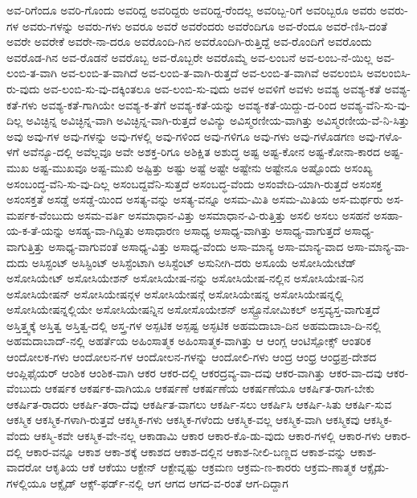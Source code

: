 {ಅವ-ರಿಗೆಂದೂ
ಅವರಿ-ಗೊಂದು
ಅವರಿದ್ದ
ಅವರಿದ್ದರು
ಅವರಿದ್ದ-ರೆಂದಲ್ಲ
ಅವರಿಬ್ಬ-ರಿಗೆ
ಅವರಿಬ್ಬರೂ
ಅವರು
ಅವರು-ಗಳ
ಅವರು-ಗಳನ್ನು
ಅವರು-ಗಳು
ಅವರೂ
ಅವರೆ
ಅವರೆಂದರು
ಅವರೆಂದಿಗೂ
ಅವ-ರೆಂದೂ
ಅವರೆ-ಣಿಸಿ-ದಂತೆ
ಅವರೇ
ಅವರೇಕೆ
ಅವರೇ-ನಾ-ದರೂ
ಅವರೊಂದಿ-ಗಿನ
ಅವರೊಂದಿಗಿ-ರುತ್ತಿದ್ದೆ
ಅವ-ರೊಂದಿಗೆ
ಅವರೊಂದು
ಅವರೊಡ-ಗಿನ
ಅವ-ರೊಡನೆ
ಅವರೊಬ್ಬ
ಅವ-ರೊಬ್ಬರೇ
ಅವರೊಮ್ಮೆ
ಅವ-ಲಂಬನೆ
ಅವ-ಲಂಬ-ನೆ-ಯಿಲ್ಲ
ಅವ-ಲಂಬಿ-ತ-ವಾಗಿ
ಅವ-ಲಂಬಿ-ತ-ವಾಗಿದೆ
ಅವ-ಲಂಬಿ-ತ-ವಾಗಿ-ರುತ್ತದೆ
ಅವ-ಲಂಬಿ-ತ-ವಾಗಿವೆ
ಅವಲಂಬಿಸಿ
ಅವಲಂಬಿಸಿ-ರು-ವುದು
ಅವ-ಲಂಬಿ-ಸು-ವು-ದಕ್ಕಿಂತಲೂ
ಅವ-ಲಂಬಿ-ಸು-ವುದು
ಅವಳ
ಅವಳಿಗೆ
ಅವಳು
ಅವಶ್ಯ
ಅವಶ್ಯ-ಕತೆ
ಅವಶ್ಯ-ಕತೆ-ಗಳು
ಅವಶ್ಯ-ಕತೆ-ಗಾಗಿಯೇ
ಅವಶ್ಯ-ಕ-ತೆಗೆ
ಅವಶ್ಯ-ಕತೆ-ಯನ್ನು
ಅವಶ್ಯ-ಕತೆ-ಯಿದ್ದು-ದ-ರಿಂದ
ಅವಶ್ಯ-ವೆನಿ-ಸು-ವು-ದಿಲ್ಲ
ಅವಿಚ್ಛಿನ್ನ
ಅವಿಚ್ಛಿನ್ನ-ವಾಗಿ
ಅವಿಚ್ಛಿನ್ನ-ವಾಗಿ-ರುತ್ತದೆ
ಅವಿನ್ಯು
ಅವಿಸ್ಮರಣೀಯ-ವಾಗಿತ್ತು
ಅವಿಸ್ಮರಣೀಯ-ವೆ-ನಿ-ಸಿತ್ತು
ಅವು
ಅವು-ಗಳ
ಅವು-ಗಳನ್ನು
ಅವು-ಗಳಲ್ಲಿ
ಅವು-ಗಳಿಂದ
ಅವು-ಗಳಿಗೂ
ಅವು-ಗಳು
ಅವು-ಗಳೊಡಗಣ
ಅವು-ಗಳೊ-ಳಗೆ
ಅವೆನ್ಯೂ-ದಲ್ಲಿ
ಅವೆಲ್ಲವೂ
ಅವೇ
ಅಶಕ್ತ-ರಿಗೂ
ಅಶಿಕ್ಷಿತ
ಅಶುದ್ಧ
ಅಷ್ಟ
ಅಷ್ಟ-ಕೋನ
ಅಷ್ಟ-ಕೋನಾ-ಕಾರದ
ಅಷ್ಟ-ಮುಖ
ಅಷ್ಟ-ಮುಖವೂ
ಅಷ್ಟ-ಮುಖಿ
ಅಷ್ಟಿತ್ತು
ಅಷ್ಟು
ಅಷ್ಟೆ
ಅಷ್ಟೇ
ಅಷ್ಟೇನು
ಅಷ್ಟೇನೂ
ಅಷ್ಟೊಂದು
ಅಸಂಖ್ಯ
ಅಸಂಬಂದ್ಧ-ವೆನಿ-ಸು-ವು-ದಿಲ್ಲ
ಅಸಂಬದ್ದವೆನಿ-ಸುತ್ತದೆ
ಅಸಂಬದ್ಧ-ವೆಂದು
ಅಸಂವೇದಿ-ಯಾಗಿ-ರುತ್ತದೆ
ಅಸಂಸಕ್ತ
ಅಸಂಸಕ್ತತೆ
ಅಸಡ್ಡೆ
ಅಸಡ್ಡೆ-ಯಿಂದ
ಅಸತ್ಯ-ವನ್ನು
ಅಸತ್ಯ-ವನ್ನೂ
ಅಸಮ-ಮಿತಿ
ಅಸಮ-ಮಿತಿಯ
ಅಸ-ಮರ್ಥರು
ಅಸ-ಮರ್ಪಕ-ವೆಂಬುದು
ಅಸಮ-ವರ್ತಿ
ಅಸಮಾಧಾನ-ವಿತ್ತು
ಅಸಮಾಧಾನ-ವಿ-ರುತ್ತಿತ್ತು
ಅಸಲಿ
ಅಸಲು
ಅಸಹನೆ
ಅಸಹಾ-ಯ-ಕ-ತೆ-ಯನ್ನು
ಅಸಹ್ಯ-ವಾ-ಗಿದ್ದಿತು
ಅಸಾಧಾರಣ
ಅಸಾಧ್ಯ
ಅಸಾಧ್ಯ-ವಾಗಿತ್ತು
ಅಸಾಧ್ಯ-ವಾಗುತ್ತದೆ
ಅಸಾಧ್ಯ-ವಾಗುತ್ತಿತ್ತು
ಅಸಾಧ್ಯ-ವಾಗುವಂತೆ
ಅಸಾಧ್ಯ-ವಿತ್ತು
ಅಸಾಧ್ಯ-ವೆಂದು
ಅಸಾ-ಮಾನ್ಯ
ಅಸಾ-ಮಾನ್ಯ-ವಾದ
ಅಸಾ-ಮಾನ್ಯ-ವಾ-ದುದು
ಅಸಿಸ್ಟಂಟ್
ಅಸಿಸ್ಟಿಂಟ್
ಅಸಿಸ್ಟೆಂಟಾಗಿ
ಅಸಿಸ್ಟೆಂಟ್
ಅಸುನೀಗಿ-ದರು
ಅಸೂಯೆ
ಅಸೋಸಿಯೇಟೆಡ್
ಅಸೋಸಿಯೇಟ್
ಅಸೋಸಿಯೇಶನ್
ಅಸೋಸಿಯೇಷ-ನನ್ನು
ಅಸೋಸಿಯೇಷ-ನಲ್ಲಿನ
ಅಸೋಸಿಯೇಷ-ನಿನ
ಅಸೋಸಿಯೇಷನ್
ಅಸೋಸಿಯೇಷನ್ಗಳ
ಅಸೋಸಿಯೇಷನ್ಗೆ
ಅಸೋಸಿಯೇಷನ್ನ
ಅಸೋಸಿಯೇಷನ್ನಲ್ಲಿ
ಅಸೋಸಿಯೇಷನ್ನಲ್ಲಿಯೇ
ಅಸೋಸಿಯೇಷನ್ನಿನ
ಅಸೋಸೊಯೇಶನ್
ಅಸ್ಟ್ರೊನೋಮಿಕಲ್
ಅಸ್ತವ್ಯಸ್ತ-ವಾಗುತ್ತದೆ
ಅಸ್ತಿತ್ತ್ವಕ್ಕೆ
ಅಸ್ತಿತ್ವ
ಅಸ್ತಿತ್ವ-ದಲ್ಲಿ
ಅಸ್ತ್ರ-ಗಳ
ಅಸ್ಪಟಿಕ
ಅಸ್ಪಷ್ಟ
ಅಸ್ಫಟಿಕ
ಅಹಮದಾಬಾ-ದಿನ
ಅಹಮದಾಬಾ-ದಿ-ನಲ್ಲಿ
ಅಹಮದಾಬಾದ್-ನಲ್ಲಿ
ಅಹರ್ತೆಯ
ಅಹಿಂಸಾತ್ಮಕ
ಅಹಿಂಸಾತ್ಮಕ-ವಾಗಿತ್ತು
ಆ
ಆಂಗ್ಲ
ಆಂಟಿಸ್ಪೋಕ್ಸ್
ಆಂತರಿಕ
ಆಂದೋಲಕ-ಗಳು
ಆಂದೋಲನ-ಗಳ
ಆಂದೋಲನ-ಗಳನ್ನು
ಆಂದೋಲಿ-ಗಳು
ಆಂದ್ರ
ಆಂಧ್ರ
ಆಂಧ್ರಪ್ರ-ದೇಶದ
ಆಂಪ್ಲಿಫೈಯರ್
ಆಂಶಿಕ
ಆಂಶಿಕ-ವಾಗಿ
ಆಕರ
ಆಕರ-ದಲ್ಲಿ
ಆಕರದ್ರವ್ಯ-ವಾ-ದವು
ಆಕರ-ವಾಗಿತ್ತು
ಆಕರ-ವಾ-ದವು
ಆಕರ-ವೆಂಬುದು
ಆಕರ್ಷಕ
ಆಕರ್ಷಕ-ವಾಗಿಯೂ
ಆಕರ್ಷಣೆ
ಆಕರ್ಷಣೆಯ
ಆಕರ್ಷಣೆಯೂ
ಆಕರ್ಷಿತ-ರಾಗ-ಬೇಕು
ಆಕರ್ಷಿತ-ರಾದರು
ಆಕರ್ಷಿ-ತರಾ-ದೆವು
ಆಕರ್ಷಿತ-ವಾಗಲು
ಆಕರ್ಷಿ-ಸಲು
ಆಕರ್ಷಿಸಿ
ಆಕರ್ಷಿ-ಸಿತು
ಆಕರ್ಷಿ-ಸುವ
ಆಕಸ್ಮಿಕ
ಆಕಸ್ಮಿಕ-ಗಳಾಗಿ-ರುತ್ತವೆ
ಆಕಸ್ಮಿಕ-ಗಳು
ಆಕಸ್ಮಿಕ-ಗಳೆಂದು
ಆಕಸ್ಮಿಕ-ವಲ್ಲ
ಆಕಸ್ಮಿಕ-ವಾಗಿ
ಆಕಸ್ಮಿಕವು
ಆಕಸ್ಮಿಕ-ವೆಂದು
ಆಕಸ್ಮಿ-ಕವೇ
ಆಕಸ್ಮಿಕ-ವೇ-ನಲ್ಲ
ಆಕಾಡಾಮಿ
ಆಕಾರ
ಆಕಾರ-ಕೊ-ಡು-ವುದು
ಆಕಾರ-ಗಳಲ್ಲಿ
ಆಕಾರ-ಗಳು
ಆಕಾರ-ದಲ್ಲಿ
ಆಕಾರ-ವನ್ನೂ
ಆಕಾಶ
ಆಕಾ-ಶಕ್ಕೆ
ಆಕಾಶದ
ಆಕಾಶ-ದಲ್ಲಿನ
ಆಕಾಶ-ನೀಲಿ-ಬಣ್ಣದ
ಆಕಾಶ-ವನ್ನು
ಆಕಾಶ-ವಾದರೋ
ಆಕೃತಿಯ
ಆಕೆ
ಆಕೆಯು
ಆಕ್ಟೇನ್
ಆಕ್ಟೇವ್ನಷ್ಟು
ಆಕ್ರಮಣ
ಆಕ್ರಮ-ಣ-ಕಾರರು
ಆಕ್ರಮ-ಣಾತ್ಮಕ
ಆಕ್ಸೈಡು-ಗಳಲ್ಲಿಯೂ
ಆಕ್ಸೈಡ್
ಆಕ್ಸ್-ಫರ್ಡ್-ನಲ್ಲಿ
ಆಗ
ಆಗದ
ಆಗದ-ವ-ರಂತೆ
ಆಗ-ದಿದ್ದಾಗ
}
